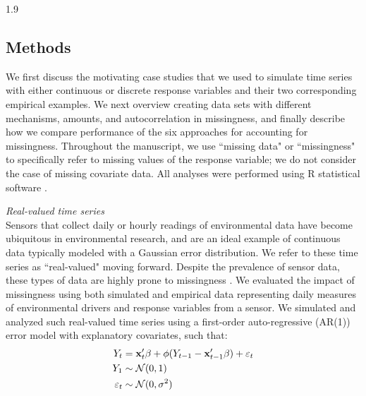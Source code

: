 \documentclass[12pt,english]{article} %
\begin{document}
\begin{linenumbers}
\begin{spacing}{1.9}
\begin{flushleft}
\section*{Methods} 
\vspace{-1.5em}


We first discuss the motivating case studies that we used to simulate time series with either continuous or discrete response variables and their two corresponding empirical examples. We next overview creating data sets with different mechanisms, amounts, and autocorrelation in missingness, and finally describe how we compare performance of the six approaches for accounting for missingness. Throughout the manuscript, we use ``missing data" or ``missingness" to specifically refer to missing values of the response variable; we do not consider the case of missing covariate data. All analyses were performed using R statistical software \cite{r_2021}.

\textit{Real-valued time series} \\
\noindent Sensors that collect daily or hourly readings of environmental data have become ubiquitous in environmental research, and are an ideal example of continuous data typically modeled with a Gaussian error distribution. We refer to these time series as ``real-valued" moving forward. Despite the prevalence of sensor data, these types of data are highly prone to missingness \citep{chen2013ecological}. We evaluated the impact of missingness using both simulated and empirical data representing daily measures of environmental drivers and response variables from a sensor. We simulated and analyzed such real-valued time series using a first-order auto-regressive (AR(1)) error model with explanatory covariates, such that:
\vspace{-1em}
\begin{subequations}
    \begin{align}\label{eq:ar1}
        Y_t &= {\bf x}'_{t} \beta + \phi (Y_{t-1} - {\bf x}'_{t-1} \beta) + \varepsilon_t \\
        Y_1 &\sim \mathcal{N}(0,1) \\
        \varepsilon_t &\sim \mathcal{N}(0, \sigma^2)
    \end{align}
    

\end{subequations}
\end{flushleft}
\end{spacing}
\end{linenumbers}
\end{document}

